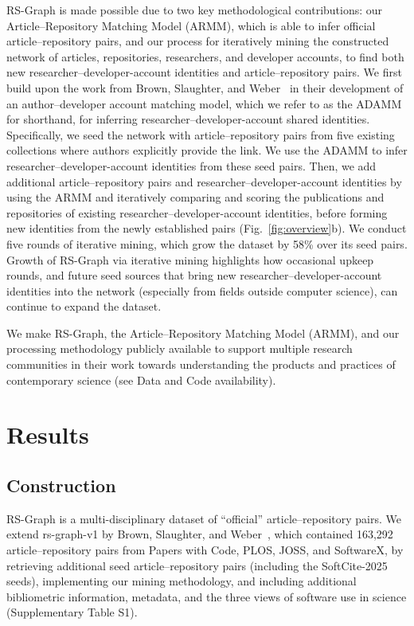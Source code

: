\documentclass[pdflatex,sn-nature]{sn-jnl}%
\begin{document}
RS-Graph is made possible due to two key methodological contributions: our Article--Repository Matching Model (ARMM), which is able to infer official article--repository pairs, and our process for iteratively mining the constructed network of articles, repositories, researchers, and developer accounts, to find both new researcher--developer-account identities and article--repository pairs. We first build upon the work from Brown, Slaughter, and Weber~\cite{brown2026code} in their development of an author--developer account matching model, which we refer to as the ADAMM for shorthand, for inferring researcher--developer-account shared identities. Specifically, we seed the network with article--repository pairs from five existing collections where authors explicitly provide the link. We use the ADAMM to infer researcher--developer-account identities from these seed pairs. Then, we add additional article--repository pairs and researcher--developer-account identities by using the ARMM and iteratively comparing and scoring the publications and repositories of existing researcher--developer-account identities, before forming new identities from the newly established pairs (Fig.~\ref{fig:overview}b). We conduct five rounds of iterative mining, which grow the dataset by 58\% over its seed pairs. Growth of RS-Graph via iterative mining highlights how occasional upkeep rounds, and future seed sources that bring new researcher--developer-account identities into the network (especially from fields outside computer science), can continue to expand the dataset.

We make RS-Graph, the Article--Repository Matching Model (ARMM), and our processing methodology publicly available to support multiple research communities in their work towards understanding the products and practices of contemporary science (see Data and Code availability).

\section{Results}\label{sec:results}

\subsection{Construction}\label{subsec:construction}

RS-Graph is a multi-disciplinary dataset of ``official'' article--repository pairs. We extend rs-graph-v1 by Brown, Slaughter, and Weber~\cite{brown2026code}, which contained 163,292 article--repository pairs from Papers with Code, PLOS, JOSS, and SoftwareX, by retrieving additional seed article--repository pairs (including the SoftCite-2025 seeds), implementing our mining methodology, and including additional bibliometric information, metadata, and the three views of software use in science (Supplementary Table S1).
\end{document}
